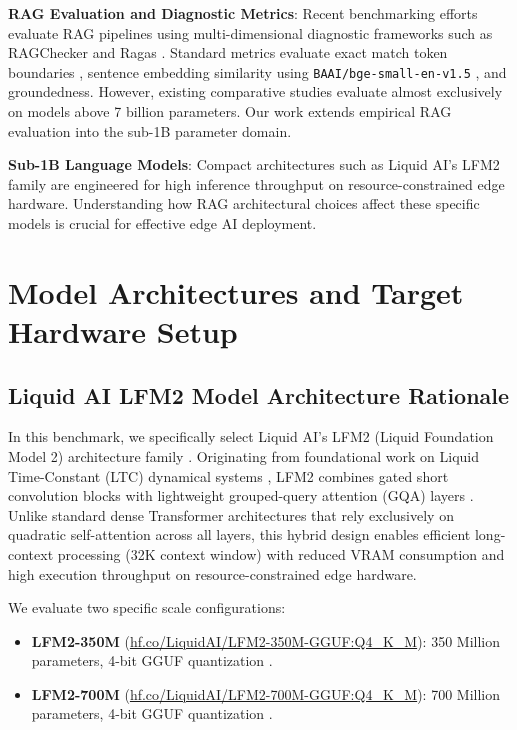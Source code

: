 \documentclass[conference]{IEEEtran}
\begin{document}
\textbf{RAG Evaluation and Diagnostic Metrics}: Recent benchmarking efforts evaluate RAG pipelines using multi-dimensional diagnostic frameworks such as RAGChecker and Ragas \cite{asai2023self, li2024retrieval}. Standard metrics evaluate exact match token boundaries \cite{rajpurkar2016squad}, sentence embedding similarity using \texttt{BAAI/bge-small-en-v1.5} \cite{reimers2019sentence, bge2023embedding}, and groundedness. However, existing comparative studies evaluate almost exclusively on models above 7 billion parameters. Our work extends empirical RAG evaluation into the sub-1B parameter domain.

\textbf{Sub-1B Language Models}: Compact architectures such as Liquid AI's LFM2 family \cite{liquid2024lfm} are engineered for high inference throughput on resource-constrained edge hardware. Understanding how RAG architectural choices affect these specific models is crucial for effective edge AI deployment.

\section{Model Architectures and Target Hardware Setup}
\label{sec:models}

\subsection{Liquid AI LFM2 Model Architecture Rationale}
In this benchmark, we specifically select Liquid AI's LFM2 (Liquid Foundation Model 2) architecture family \cite{liquid2024lfm}. Originating from foundational work on Liquid Time-Constant (LTC) dynamical systems \cite{hasani2020liquid}, LFM2 combines gated short convolution blocks with lightweight grouped-query attention (GQA) layers \cite{liquid2024lfm}. Unlike standard dense Transformer architectures that rely exclusively on quadratic self-attention across all layers, this hybrid design enables efficient long-context processing (32K context window) with reduced VRAM consumption and high execution throughput on resource-constrained edge hardware.

We evaluate two specific scale configurations:
\begin{itemize}
    \item \textbf{LFM2-350M} (\url{hf.co/LiquidAI/LFM2-350M-GGUF:Q4_K_M}): 350 Million parameters, 4-bit GGUF quantization \cite{liquid2024lfm}.
    \item \textbf{LFM2-700M} (\url{hf.co/LiquidAI/LFM2-700M-GGUF:Q4_K_M}): 700 Million parameters, 4-bit GGUF quantization \cite{liquid2024lfm}.
\end{itemize}
\end{document}
